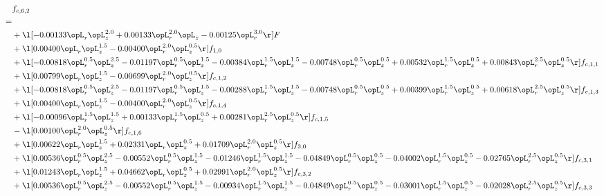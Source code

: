 \begin{alignat}{2} 
\label{eq:f_62_1} 
& f_{c,6,2} \nonumber \\ 
 = \\ 
& + \l[  -0.00133 \opL_r \opL_z^{2.0} +  0.00133 \opL_r^{2.0} \opL_z   -0.00125 \opL_r^{3.0}  \r] F \nonumber \\ 
& + \l[  0.00400 \opL_r \opL_z^{1.5}   -0.00400 \opL_r^{2.0} \opL_z^{0.5}  \r] f_{1,0} \nonumber \\ 
& + \l[  -0.00818 \opL_r^{0.5} \opL_z^{2.5}   -0.01197 \opL_r^{0.5} \opL_z^{1.5}   -0.00384 \opL_r^{1.5} \opL_z^{1.5}   -0.00748 \opL_r^{0.5} \opL_z^{0.5} +  0.00532 \opL_r^{1.5} \opL_z^{0.5} +  0.00843 \opL_r^{2.5} \opL_z^{0.5}  \r] f_{c,1,1} \nonumber \\ 
& + \l[  0.00799 \opL_r \opL_z^{1.5}   -0.00699 \opL_r^{2.0} \opL_z^{0.5}  \r] f_{c,1,2} \nonumber \\ 
& + \l[  -0.00818 \opL_r^{0.5} \opL_z^{2.5}   -0.01197 \opL_r^{0.5} \opL_z^{1.5}   -0.00288 \opL_r^{1.5} \opL_z^{1.5}   -0.00748 \opL_r^{0.5} \opL_z^{0.5} +  0.00399 \opL_r^{1.5} \opL_z^{0.5} +  0.00618 \opL_r^{2.5} \opL_z^{0.5}  \r] f_{c,1,3} \nonumber \\ 
& + \l[  0.00400 \opL_r \opL_z^{1.5}   -0.00400 \opL_r^{2.0} \opL_z^{0.5}  \r] f_{c,1,4} \nonumber \\ 
& + \l[  -0.00096 \opL_r^{1.5} \opL_z^{1.5} +  0.00133 \opL_r^{1.5} \opL_z^{0.5} +  0.00281 \opL_r^{2.5} \opL_z^{0.5}  \r] f_{c,1,5} \nonumber \\ 
& - \l[  0.00100 \opL_r^{2.0} \opL_z^{0.5}  \r] f_{c,1,6} \nonumber \\ 
& + \l[  0.00622 \opL_r \opL_z^{1.5} +  0.02331 \opL_r \opL_z^{0.5} +  0.01709 \opL_r^{2.0} \opL_z^{0.5}  \r] f_{3,0} \nonumber \\ 
& + \l[  0.00536 \opL_r^{0.5} \opL_z^{2.5}   -0.00552 \opL_r^{0.5} \opL_z^{1.5}   -0.01246 \opL_r^{1.5} \opL_z^{1.5}   -0.04849 \opL_r^{0.5} \opL_z^{0.5}   -0.04002 \opL_r^{1.5} \opL_z^{0.5}   -0.02765 \opL_r^{2.5} \opL_z^{0.5}  \r] f_{c,3,1} \nonumber \\ 
& + \l[  0.01243 \opL_r \opL_z^{1.5} +  0.04662 \opL_r \opL_z^{0.5} +  0.02991 \opL_r^{2.0} \opL_z^{0.5}  \r] f_{c,3,2} \nonumber \\ 
& + \l[  0.00536 \opL_r^{0.5} \opL_z^{2.5}   -0.00552 \opL_r^{0.5} \opL_z^{1.5}   -0.00934 \opL_r^{1.5} \opL_z^{1.5}   -0.04849 \opL_r^{0.5} \opL_z^{0.5}   -0.03001 \opL_r^{1.5} \opL_z^{0.5}   -0.02028 \opL_r^{2.5} \opL_z^{0.5}  \r] f_{c,3,3} \nonumber \\ 

\end{alignat}
